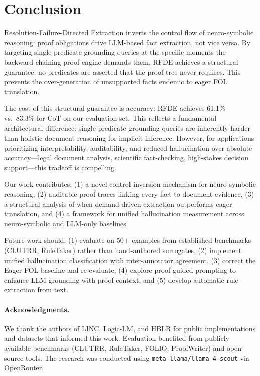 \documentclass[11pt,letterpaper]{article}
\begin{document}
\section{Conclusion}

Resolution-Failure-Directed Extraction inverts the control flow of neuro-symbolic reasoning:
proof obligations drive LLM-based fact extraction, not vice versa. By targeting
single-predicate grounding queries at the specific moments the backward-chaining proof engine
demands them, RFDE achieves a structural guarantee: no predicates are asserted that the proof
tree never requires. This prevents the over-generation of unsupported facts endemic to eager
FOL translation.

The cost of this structural guarantee is accuracy: RFDE achieves 61.1\% vs.\ 83.3\% for CoT
on our evaluation set. This reflects a fundamental architectural difference: single-predicate
grounding queries are inherently harder than holistic document reasoning for implicit
inference. However, for applications prioritizing interpretability, auditability, and reduced
hallucination over absolute accuracy---legal document analysis, scientific fact-checking,
high-stakes decision support---this tradeoff is compelling.

Our work contributes: (1) a novel control-inversion mechanism for neuro-symbolic reasoning,
(2) auditable proof traces linking every fact to document evidence, (3) a structural analysis
of when demand-driven extraction outperforms eager translation, and (4) a framework for
unified hallucination measurement across neuro-symbolic and LLM-only baselines.

Future work should: (1) evaluate on 50+ examples from established benchmarks (CLUTRR,
RuleTaker) rather than hand-authored surrogates, (2) implement unified hallucination
classification with inter-annotator agreement, (3) correct the Eager FOL baseline and
re-evaluate, (4) explore proof-guided prompting to enhance LLM grounding with proof context,
and (5) develop automatic rule extraction from text.

\paragraph{Acknowledgments.}
We thank the authors of LINC, Logic-LM, and HBLR for public implementations and datasets that
informed this work. Evaluation benefited from publicly available benchmarks (CLUTRR, RuleTaker,
FOLIO, ProofWriter) and open-source tools. The research was conducted using
\texttt{meta-llama/llama-4-scout} via OpenRouter.



\end{document}
